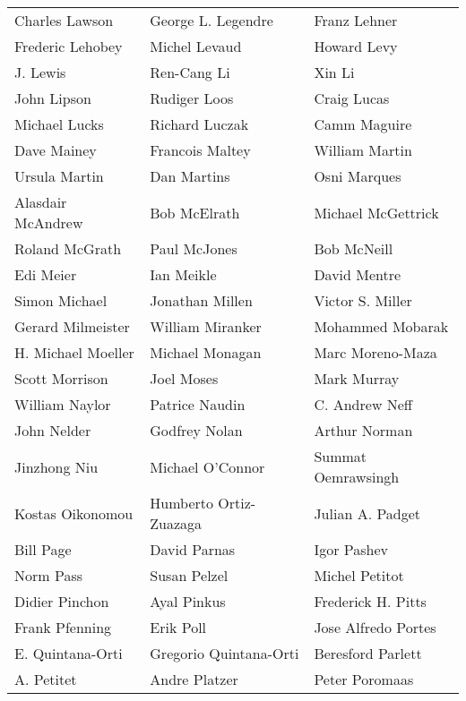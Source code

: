 \begin{tabular}{lll}
Charles Lawson         & George L. Legendre     & Franz Lehner\\
Frederic Lehobey       & Michel Levaud          & Howard Levy\\
J. Lewis               & Ren-Cang Li            & Xin Li\\
John Lipson            & Rudiger Loos           & Craig Lucas\\
Michael Lucks          & Richard Luczak         & Camm Maguire\\
Dave Mainey            & Francois Maltey        & William Martin\\
Ursula Martin          & Dan Martins            & Osni Marques\\
Alasdair McAndrew      & Bob McElrath           & Michael McGettrick\\
Roland McGrath         & Paul McJones           & Bob McNeill\\
Edi Meier              & Ian Meikle             & David Mentre\\
Simon Michael          & Jonathan Millen        & Victor S. Miller\\
Gerard Milmeister      & William Miranker       & Mohammed Mobarak\\
H. Michael Moeller     & Michael Monagan        & Marc Moreno-Maza\\
Scott Morrison         & Joel Moses             & Mark Murray\\
William Naylor         & Patrice Naudin         & C. Andrew Neff\\
John Nelder            & Godfrey Nolan          & Arthur Norman\\
Jinzhong Niu           & Michael O'Connor       & Summat Oemrawsingh\\
Kostas Oikonomou       & Humberto Ortiz-Zuazaga & Julian A. Padget\\
Bill Page              & David Parnas           & Igor Pashev\\
Norm Pass              & Susan Pelzel           & Michel Petitot\\
Didier Pinchon         & Ayal Pinkus            & Frederick H. Pitts\\
Frank Pfenning         & Erik Poll              & Jose Alfredo Portes\\
E. Quintana-Orti       & Gregorio Quintana-Orti & Beresford Parlett\\
A. Petitet             & Andre Platzer          & Peter Poromaas\\

\end{tabular}
